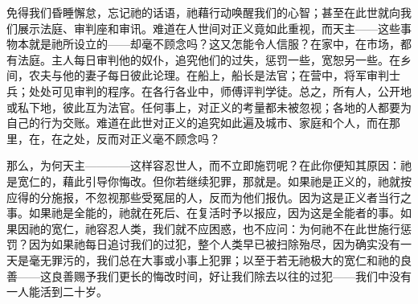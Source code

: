 免得我们昏睡懈怠，忘记祂的话语，祂藉行动唤醒我们的心智；甚至在此世就向我们展示法庭、审判座和审讯。难道在人世间对正义竟如此重视，而天主——这些事物本就是祂所设立的——却毫不顾念吗？这又怎能令人信服？在家中，在市场，都有法庭。主人每日审判他的奴仆，追究他们的过失，惩罚一些，宽恕另一些。在乡间，农夫与他的妻子每日彼此论理。在船上，船长是法官；在营中，将军审判士兵；处处可见审判的程序。在各行各业中，师傅评判学徒。总之，所有人，公开地或私下地，彼此互为法官。任何事上，对正义的考量都未被忽视；各地的人都要为自己的行为交账。难道在此世对正义的追究如此遍及城市、家庭和个人，而在那里，在，在之处，反而对正义毫不顾念吗？\par

那么，为何天主————这样容忍世人，而不立即施罚呢？在此你便知其原因：祂是宽仁的，藉此引导你悔改。但你若继续犯罪，那就是。如果祂是正义的，祂就按应得的分施报，不忽视那些受冤屈的人，反而为他们报仇。因为这是正义者当行之事。如果祂是全能的，祂就在死后、在复活时予以报应，因为这是全能者的事。如果因祂的宽仁，祂容忍人类，我们就不应困惑，也不应问：为何祂不在此世施行惩罚？因为如果祂每日追讨我们的过犯，整个人类早已被扫除殆尽，因为确实没有一天是毫无罪污的，我们总在大事或小事上犯罪；以至于若无祂极大的宽仁和祂的良善——这良善赐予我们更长的悔改时间，好让我们除去以往的过犯——我们中没有一人能活到二十岁。\par

